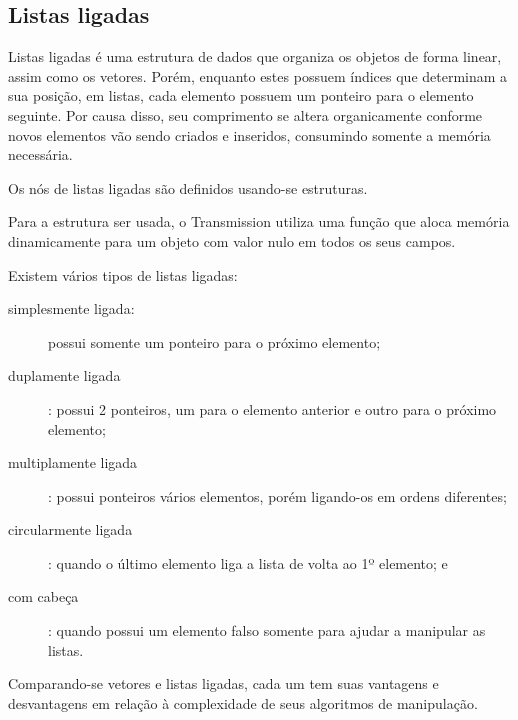 
\newpage
\subsection*{Listas ligadas}

Listas ligadas é uma estrutura de dados que organiza os objetos de forma linear, assim
como os vetores. Porém, enquanto estes possuem índices que determinam a sua posição, em
listas, cada elemento possuem um ponteiro para o elemento seguinte. Por causa disso,
seu comprimento se altera organicamente conforme novos elementos vão sendo criados e
inseridos, consumindo somente a memória necessária.

Os nós de listas ligadas são definidos usando-se estruturas.


Para a estrutura ser usada, o Transmission utiliza uma função que aloca memória
dinamicamente para um objeto com valor nulo em todos os seus campos.


Existem vários tipos de listas ligadas:

\begin{description}
    \item[simplesmente ligada:] possui somente um ponteiro para o próximo elemento;
    \item[duplamente ligada]: possui 2 ponteiros, um para o elemento anterior e outro
        para o próximo elemento;
    \item[multiplamente ligada]: possui ponteiros vários elementos, porém ligando-os em
        ordens diferentes;
    \item[circularmente ligada]: quando o último elemento liga a lista de volta ao
        1º elemento; e
    \item[com cabeça]: quando possui um elemento falso somente para ajudar a manipular as
        listas.
\end{description}

Comparando-se vetores e listas ligadas, cada um tem suas vantagens e desvantagens em
relação à complexidade de seus algoritmos de manipulação.

